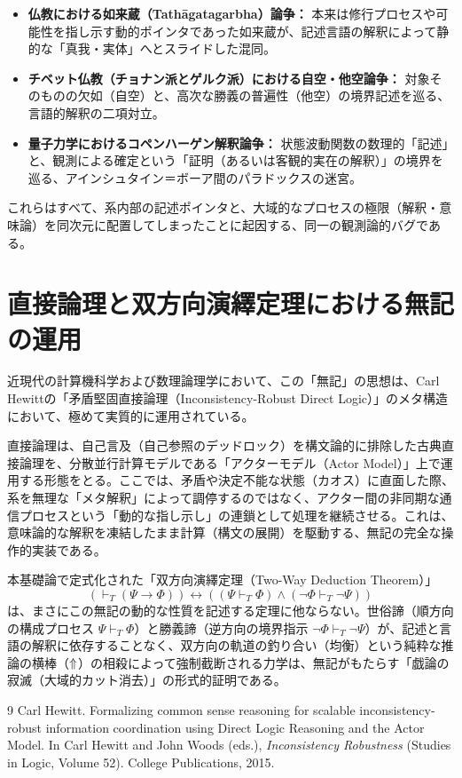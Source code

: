 \documentclass[11pt,a4paper]{ltjsarticle}
\begin{document}
\begin{itemize}
    \item \textbf{仏教における如来蔵（Tathāgatagarbha）論争：} 本来は修行プロセスや可能性を指し示す動的ポインタであった如来蔵が、記述言語の解釈によって静的な「真我・実体」へとスライドした混同。
    \item \textbf{チベット仏教（チョナン派とゲルク派）における自空・他空論争：} 対象そのものの欠如（自空）と、高次な勝義の普遍性（他空）の境界記述を巡る、言語的解釈の二項対立。
    \item \textbf{量子力学におけるコペンハーゲン解釈論争：} 状態波動関数の数理的「記述」と、観測による確定という「証明（あるいは客観的実在の解釈）」の境界を巡る、アインシュタイン＝ボーア間のパラドックスの迷宮。
\end{itemize}

これらはすべて、系内部の記述ポインタと、大域的なプロセスの極限（解釈・意味論）を同次元に配置してしまったことに起因する、同一の観測論的バグである。

\section{直接論理と双方向演繹定理における無記の運用}
近現代の計算機科学および数理論理学において、この「無記」の思想は、Carl Hewittの「矛盾堅固直接論理（Inconsistency-Robust Direct Logic）」のメタ構造において、極めて実質的に運用されている。

直接論理は、自己言及（自己参照のデッドロック）を構文論的に排除した古典直接論理を、分散並行計算モデルである「アクターモデル（Actor Model）」上で運用する形態をとる。ここでは、矛盾や決定不能な状態（カオス）に直面した際、系を無理な「メタ解釈」によって調停するのではなく、アクター間の非同期な通信プロセスという「動的な指し示し」の連鎖として処理を継続させる。これは、意味論的な解釈を凍結したまま計算（構文の展開）を駆動する、無記の完全な操作的実装である。

本基礎論で定式化された「双方向演繹定理（Two-Way Deduction Theorem）」
\[
(\vdash_T (\Psi \rightarrow \Phi)) \leftrightarrow ((\Psi \vdash_T \Phi) \land (\neg\Phi \vdash_T \neg\Psi))
\]
は、まさにこの無記の動的な性質を記述する定理に他ならない。世俗諦（順方向の構成プロセス $\Psi \vdash_T \Phi$）と勝義諦（逆方向の境界指示 $\neg\Phi \vdash_T \neg\Psi$）が、記述と言語の解釈に依存することなく、双方向の軌道の釣り合い（均衡）という純粋な推論の横棒（$\Uparrow$）の相殺によって強制截断される力学は、無記がもたらす「戯論の寂滅（大域的カット消去）」の形式的証明である。

\begin{thebibliography}{9}
Carl Hewitt.
\newblock Formalizing common sense reasoning for scalable inconsistency-robust information coordination using Direct Logic Reasoning and the Actor Model.
\newblock In Carl Hewitt and John Woods (eds.), \emph{Inconsistency Robustness} (Studies in Logic, Volume 52). College Publications, 2015.
\end{thebibliography}
\end{document}
